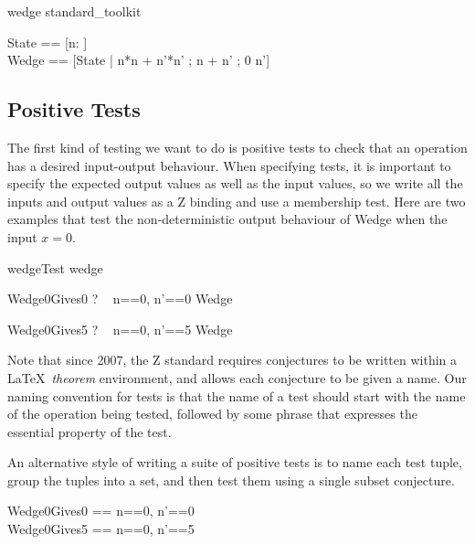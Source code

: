 \documentclass{llncs}
\begin{document}
\begin{zsection}
  \SECTION wedge \parents standard\_toolkit
\end{zsection}
\begin{zed}
  State == [n:  ] \\
  Wedge == [\Delta State | n*n + n'*n' ; n + n' ; 0 \leq n']
\end{zed}

\subsection{Positive Tests}

The first kind of testing we want to do is positive tests to check
that an operation has a desired input-output behaviour.  When
specifying tests, it is important to specify the expected output
values as well as the input values, so we write all the inputs and
output values as a Z binding and use a membership test.  Here are two
examples that test the non-deterministic output behaviour of Wedge
when the input $x=0$.  

\begin{zsection}
  \SECTION wedgeTest \parents wedge
\end{zsection}

\begin{theorem}{Wedge0Gives0}
  \vdash? ~ \lblot n==0, n'==0 \rblot \in Wedge
\end{theorem}
\vspace{-5ex}
\begin{theorem}{Wedge0Gives5}
  \vdash? ~ \lblot n==0, n'==5 \rblot \in Wedge
\end{theorem}

Note that since 2007, the Z standard requires conjectures
to be written within a \LaTeX\ \emph{theorem} environment, and allows
each conjecture to be given a name.  Our naming convention for tests
is that the name of a test should start with the name of the operation
being tested, followed by some phrase that expresses the essential
property of the test.

An alternative style of writing a suite of positive tests is to 
name each test tuple, group the tuples into a set, and then test
them using a single subset conjecture.

\begin{zed}
  Wedge0Gives0 == \lblot n==0, n'==0 \rblot \\
  Wedge0Gives5 == \lblot n==0, n'==5 \rblot
\end{zed}
\end{document}
